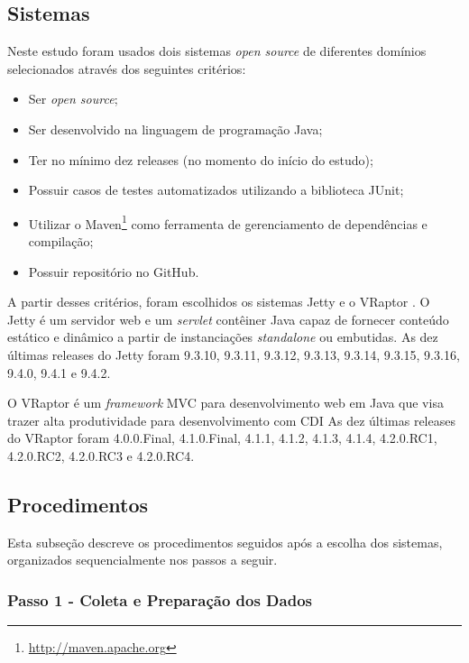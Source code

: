 \begin{itemize}
\end{itemize}

\subsection{Sistemas} \label{subsec:avaliacao-sistemas}

Neste estudo foram usados dois sistemas \textit{open source} de diferentes domínios selecionados através dos seguintes critérios:
\begin{itemize}
  \item Ser \textit{open source};
  \item Ser desenvolvido na linguagem de programação Java;
  \item Ter no mínimo dez releases (no momento do início do estudo);
  \item Possuir casos de testes automatizados utilizando a biblioteca JUnit;
  \item Utilizar o Maven\footnote{\href{http://maven.apache.org}{http://maven.apache.org}} como ferramenta de gerenciamento de dependências e compilação;
  \item Possuir repositório no GitHub.
\end{itemize}

A partir desses critérios, foram escolhidos os sistemas Jetty \cite{Jetty2016} e o VRaptor \cite{VRaptor2017}. O Jetty é um servidor web e um \textit{servlet} contêiner Java capaz de fornecer conteúdo estático e dinâmico a partir de instanciações \textit{standalone} ou embutidas. As dez últimas releases do Jetty foram 9.3.10, 9.3.11, 9.3.12, 9.3.13, 9.3.14, 9.3.15, 9.3.16, 9.4.0, 9.4.1 e 9.4.2.

O VRaptor é um \textit{framework} MVC para desenvolvimento web em Java que visa trazer alta produtividade para desenvolvimento com CDI  As dez últimas releases do VRaptor foram 4.0.0.Final, 4.1.0.Final, 4.1.1, 4.1.2, 4.1.3, 4.1.4, 4.2.0.RC1, 4.2.0.RC2, 4.2.0.RC3 e 4.2.0.RC4.

\subsection{Procedimentos} \label{subsec:avaliacao-procedimentos}

Esta subseção descreve os procedimentos seguidos após a escolha dos sistemas, organizados sequencialmente nos passos a seguir.

\subsubsection{Passo 1 - Coleta e Preparação dos Dados} \label{subsec:avaliacao-procedimentos-passo-1}

